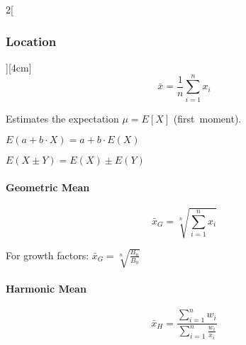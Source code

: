 \documentclass[8pt]{extarticle}
\begin{document}
\begin{multicols}{2}[\subsubsection{Location}][4cm]
 $$\bar{x}=\frac{1}{n}\sum\limits_{i=1}^n x_i$$

\noindent Estimates the expectation
$\mu = E[X]$ (first~moment).

\begin{Rechreg}
\item $E(a+b\cdot X)=a+b\cdot E(X)$
\item $E(X\pm Y)=E(X)\pm E(Y)$
\end{Rechreg}

\paragraph{Geometric Mean}

$$\bar{x}_G=\sqrt[n]{\sum\limits_{i=1}^n x_i} $$

\noindent For growth factors: $\bar{x}_G=\sqrt[n]{\frac{B_n}{B_0}}$

\paragraph{Harmonic Mean}

$$\bar{x}_H=\frac{\sum\limits_{i=1}^n w_i}{\sum\limits_{i=1}^n \frac{w_i}{x_i}}$$


\end{multicols}
\end{document}

